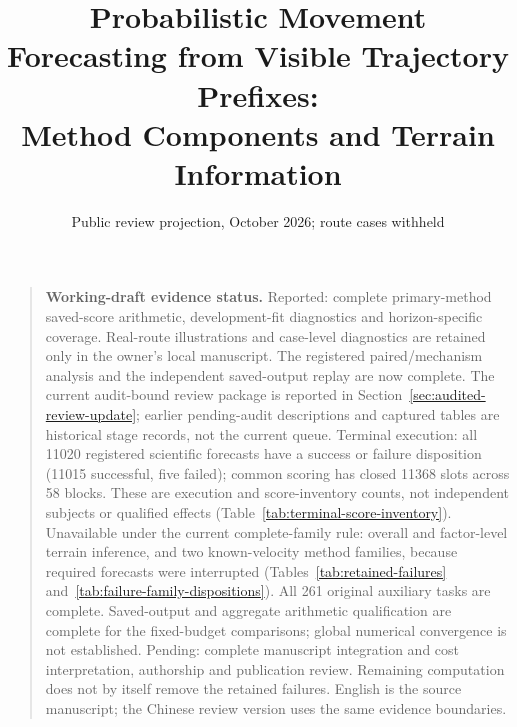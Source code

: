 \documentclass[11pt]{article}
\title{Probabilistic Movement Forecasting from Visible Trajectory Prefixes:\\
Method Components and Terrain Information}
\author{}
\date{Public review projection, October 2026; route cases withheld}
\begin{document}
\maketitle
\begin{quote}\small
\textbf{Working-draft evidence status.}
Reported: complete primary-method saved-score arithmetic, development-fit
diagnostics and horizon-specific coverage. Real-route illustrations and
case-level diagnostics are retained only in the owner's local manuscript.
The registered paired/mechanism analysis and the independent saved-output
replay are now complete. The current audit-bound review package is reported
in Section~\ref{sec:audited-review-update}; earlier pending-audit descriptions
and captured tables are historical stage records, not the current queue.
Terminal execution: all 11020 registered scientific forecasts have a success
or failure disposition (11015 successful, five failed); common scoring has
closed 11368 slots across 58 blocks. These are execution and score-inventory
counts, not independent subjects or qualified effects
(Table~\ref{tab:terminal-score-inventory}).
Unavailable under the current complete-family rule: overall and factor-level
terrain inference, and two known-velocity method families, because required
forecasts were interrupted (Tables~\ref{tab:retained-failures}
and~\ref{tab:failure-family-dispositions}).
All 261 original auxiliary tasks are complete. Saved-output and aggregate
arithmetic qualification are complete for the fixed-budget comparisons;
global numerical convergence is not established. Pending: complete manuscript
integration and cost interpretation,
authorship and publication review. Remaining computation does not by itself
remove the retained failures. English is the source manuscript; the Chinese
review version uses the same evidence boundaries.
\end{quote}
\end{document}
